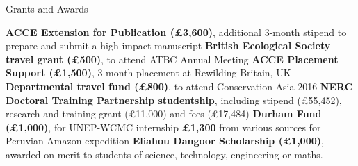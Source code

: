 \begin{rubric}{Grants and Awards}

\entry*[2018] \textbf{ACCE Extension for Publication (£3,600)}, additional 3-month stipend to prepare and submit a high impact manuscript
\entry*[2018] \textbf{British Ecological Society travel grant (£500)}, to attend ATBC Annual Meeting
\entry*[2016] \textbf{ACCE Placement Support (£1,500)}, 3-month placement at Rewilding Britain, UK
\entry*[2016] \textbf{Departmental travel fund (£800)}, to attend Conservation Asia 2016
\entry*[2014] \textbf{NERC Doctoral Training Partnership studentship}, including stipend (£55,452), research and training grant (£11,000) and fees (£17,484)
\entry*[2013] \textbf{Durham Fund (£1,000)}, for UNEP-WCMC internship
\entry*[2011] \textbf{£1,300} from various sources for Peruvian Amazon expedition
\entry*[2010] \textbf{Eliahou Dangoor Scholarship (£1,000)}, awarded on merit to students of science, technology, engineering or maths.
\end{rubric}